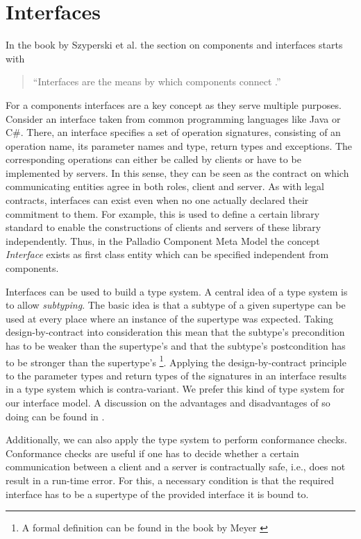 \section{Interfaces} %

In the book by Szyperski et al. the section on components and interfaces starts with

\begin{quote}
"`Interfaces are the means by which components connect \cite[p. 50]{szyperski2002a}."'
\end{quote}

For a components interfaces are a key concept as they serve multiple purposes. Consider an interface taken from common programming languages like Java or C\#. There, an interface specifies a set of operation signatures, consisting of an operation name, its parameter names and type, return types and exceptions. The corresponding operations can either be called by clients or have to be implemented by servers. In this sense, they can be seen as the contract on which communicating entities agree in both roles, client and server. As with legal contracts, interfaces can exist even when no one actually declared their commitment to them. For example, this is used to define a certain library standard to enable the constructions of clients and servers of these library independently. Thus, in the Palladio Component Meta Model the concept \emph{Interface} exists as first class entity which can be specified independent from components.

Interfaces can be used to build a type system. A central idea of a type system is to allow \emph{subtyping}. The basic idea is that a subtype of a given supertype can be used at every place where an instance of the supertype was expected. Taking design-by-contract \cite{meyer1997a} into consideration this mean that the subtype's precondition has to be weaker than the supertype's and that the subtype's postcondition has to be stronger than the supertype's \footnote{A formal definition can be found in the book by Meyer \cite{meyer1997a}}. Applying the design-by-contract principle to the parameter types and return types of the signatures in an interface results in a type system which is contra-variant. We prefer this kind of type system for our interface model. A discussion on the advantages and disadvantages of so doing can be found in \cite[p. 628ff]{meyer1997a}.

Additionally, we can also apply the type system to perform conformance checks. Conformance checks are useful if one has to decide whether a certain communication between a client and a server is contractually safe, i.e., does not result in a run-time error. For this, a necessary condition is that the required interface has to be a supertype of the provided interface it is bound to. 

